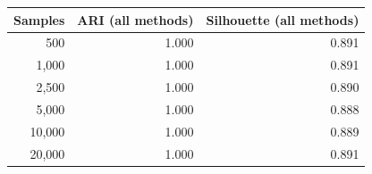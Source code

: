\begin{tabular}{rrr}
\toprule
\textbf{Samples} & \textbf{ARI (all methods)} & \textbf{Silhouette (all methods)} \\
\midrule
500 & 1.000 & 0.891 \\
1,000 & 1.000 & 0.891 \\
2,500 & 1.000 & 0.890 \\
5,000 & 1.000 & 0.888 \\
10,000 & 1.000 & 0.889 \\
20,000 & 1.000 & 0.891 \\
\bottomrule
\end{tabular}
